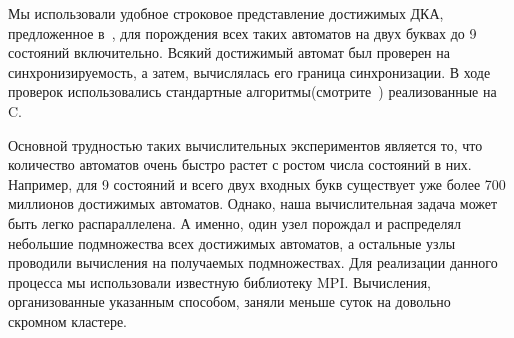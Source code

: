 \documentclass[11pt]{article}
\newcommand{\san}{synchronizing automaton}
\begin{document}

Мы использовали удобное строковое представление достижимых ДКА, предложенное
в~\cite{AMR}, для порождения всех таких автоматов на двух буквах до 9 состояний
включительно. Всякий достижимый автомат был проверен на синхронизируемость, а
затем, вычислялась его граница синхронизации. В ходе проверок использовались
стандартные алгоритмы(смотрите~\cite{Sa05,Vo08}) реализованные на C.


Основной трудностью таких вычислительных экспериментов является то, что количество
автоматов очень быстро растет с ростом числа состояний в них. Например, для 9 состояний
и всего двух входных букв существует уже более 700 миллионов достижимых автоматов.
Однако, наша вычислительная задача может быть легко распараллелена. А именно,
один узел порождал и распределял небольшие подмножества всех достижимых автоматов, а остальные
узлы проводили вычисления на получаемых подмножествах. Для реализации данного процесса
мы использовали известную библиотеку MPI. Вычисления, организованные указанным способом,
заняли меньше суток на довольно скромном кластере.


\end{document}
